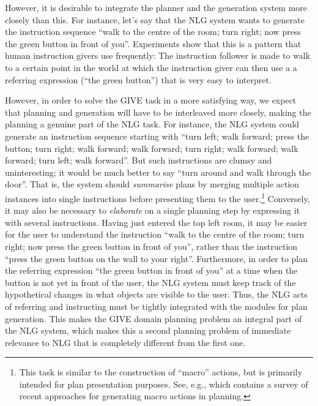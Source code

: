 However, it is desirable to integrate the planner and the generation
system more closely than this. For instance, let's say that the NLG
system wants to generate the instruction sequence ``walk to the centre
of the room; turn right; now press the green button in front of you''.
Experiments  show that this is a pattern that human
instruction givers use frequently: The instruction follower is made to
walk to a certain point in the world at which the instruction giver
can then use a a referring expression (``the green button'') that is
very easy to interpret. 



However, in order to solve the GIVE task in a more satisfying way, we
expect that planning and generation will have to be interleaved more
closely, making the planning a genuine part of the NLG task. For
instance, the NLG system could generate an instruction sequence
starting with ``turn left; walk forward; press the button; turn right;
walk forward; walk forward; turn right; walk forward; walk forward;
turn left; walk forward''. But such instructions are clumsy and
uninteresting; it would be much better to say ``turn around and walk
through the door''. That is, the system should \emph{summarise} plans
by merging multiple action instances into single instructions before
presenting them to the user.\footnote{This task is similar to the
  construction of ``macro'' actions, but is primarily intended for
  plan presentation purposes. See, e.g., \citep{Botea-etal:05} which
  contains a survey of recent approaches for generating macro actions
  in planning.}  Conversely, it may also be necessary to
\emph{elaborate} on a single planning step by expressing it with
several instructions. Having just entered the top left room, it may be
easier for the user to understand the instruction ``walk to the centre
of the room; turn right; now press the green button in front of you'',
rather than the instruction ``press the green button on the wall to
your right''. Furthermore, in order to plan the referring expression
``the green button in front of you'' at a time when the button is not
yet in front of the user, the NLG system must keep track of the
hypothetical changes in what objects are visible to the user. Thus,
the NLG acts of referring and instructing must be tightly integrated
with the modules for plan generation. This makes the GIVE domain
planning problem an integral part of the NLG system, which makes this
a second planning problem of immediate relevance to NLG that is
completely different from the first one.

